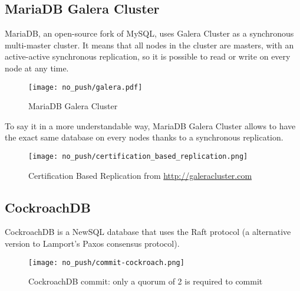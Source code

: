 \documentclass[a4paper, 10pt, titlepage]{report}
\begin{document}
\subsection{MariaDB Galera Cluster}

MariaDB, an open-source fork of MySQL, uses Galera Cluster as a synchronous multi-master cluster. It means that all nodes in the cluster are masters, with an active-active synchronous replication, so it is possible to read or write on every node at any time.

\begin{figure}[H]
  \vspace{-10pt}
  \centering
  \centerline{\texttt{[image: no\_push/galera.pdf]}}
  \vspace{-5pt}
  \caption{MariaDB Galera Cluster}
  \vspace{-5pt}
  \label{fig:MGC}
\end{figure}

To say it in a more understandable way, MariaDB Galera Cluster allows to have the exact same database on every nodes thanks to a synchronous replication.


\begin{figure}[H]
  \vspace{-10pt}
  \centering
  \centerline{\texttt{[image: no\_push/certification\_based\_replication.png]}}
  \vspace{-5pt}
  \caption{Certification Based Replication from \url{http://galeracluster.com} }
  \vspace{-5pt}
  \label{fig:MGC}
\end{figure}






\subsection{CockroachDB}

CockroachDB is a NewSQL database that uses the Raft protocol (a alternative version to Lamport's Paxos consensus protocol).

\begin{figure}[H]
  \vspace{-10pt}
  \centering
  \centerline{\texttt{[image: no\_push/commit-cockroach.png]}}
  \vspace{-5pt}
  \caption{CockroachDB commit: only a quorum of 2 is required to commit }
  \vspace{-5pt}
  \label{fig:MGC}
\end{figure}
\end{document}
